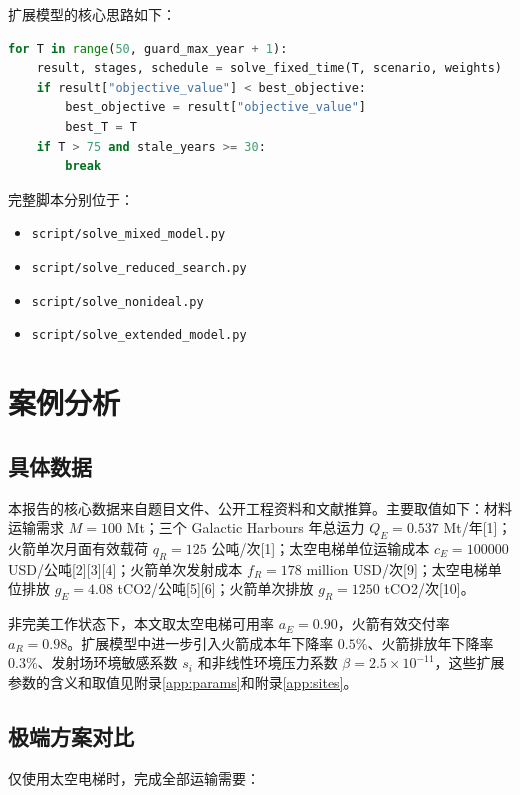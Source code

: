 \documentclass[12pt,a4paper,UTF8]{article}
\begin{document}
扩展模型的核心思路如下：

\begin{lstlisting}[language=Python]
for T in range(50, guard_max_year + 1):
    result, stages, schedule = solve_fixed_time(T, scenario, weights)
    if result["objective_value"] < best_objective:
        best_objective = result["objective_value"]
        best_T = T
    if T > 75 and stale_years >= 30:
        break
\end{lstlisting}

完整脚本分别位于：

\begin{itemize}
    \item \texttt{script/solve\_mixed\_model.py}
    \item \texttt{script/solve\_reduced\_search.py}
    \item \texttt{script/solve\_nonideal.py}
    \item \texttt{script/solve\_extended\_model.py}
\end{itemize}

\clearpage
\section{案例分析}

\subsection{具体数据}

本报告的核心数据来自题目文件、公开工程资料和文献推算。主要取值如下：材料运输需求 \(M=100\) Mt；三个 Galactic Harbours 年总运力 \(Q_E=0.537\) Mt/年[1]；火箭单次月面有效载荷 \(q_R=125\) 公吨/次[1]；太空电梯单位运输成本 \(c_E=100000\) USD/公吨[2][3][4]；火箭单次发射成本 \(f_R=178\) million USD/次[9]；太空电梯单位排放 \(g_E=4.08\) tCO2/公吨[5][6]；火箭单次排放 \(g_R=1250\) tCO2/次[10]。

非完美工作状态下，本文取太空电梯可用率 \(a_E=0.90\)，火箭有效交付率 \(a_R=0.98\)。扩展模型中进一步引入火箭成本年下降率 \(0.5\%\)、火箭排放年下降率 \(0.3\%\)、发射场环境敏感系数 \(s_i\) 和非线性环境压力系数 \(\beta=2.5\times10^{-11}\)，这些扩展参数的含义和取值见附录\ref{app:params}和附录\ref{app:sites}。

\subsection{极端方案对比}

仅使用太空电梯时，完成全部运输需要：
\end{document}

